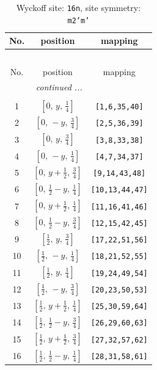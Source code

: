 \documentclass[fleqn,8pt]{jsarticle}
\begin{document}
\renewcommand{\arraystretch}{1.2}
\begin{longtable}{ccc}
\caption{Wyckoff site: {\tt 16n}, site symmetry: {\tt m2'm'}}
 \\
 \hline \hline
No. & position & mapping \\ \hline \endfirsthead

\multicolumn{2}{l}{\tablename\ \thetable{}} \\
 \hline \hline
No. & position & mapping \\ \hline \endhead

 \hline \hline
\multicolumn{2}{r}{\footnotesize\it continued ...} \\ \endfoot

 \hline \hline
\multicolumn{2}{r}{} \\ \endlastfoot

1 & $\left[ 0,\, y,\, \frac{1}{4} \right]$ & {\tt [1,6,35,40]} \\ \hline
2 & $\left[ 0,\, - y,\, \frac{3}{4} \right]$ & {\tt [2,5,36,39]} \\ \hline
3 & $\left[ 0,\, y,\, \frac{3}{4} \right]$ & {\tt [3,8,33,38]} \\ \hline
4 & $\left[ 0,\, - y,\, \frac{1}{4} \right]$ & {\tt [4,7,34,37]} \\ \hline
5 & $\left[ 0,\, y + \frac{1}{2},\, \frac{3}{4} \right]$ & {\tt [9,14,43,48]} \\ \hline
6 & $\left[ 0,\, \frac{1}{2} - y,\, \frac{1}{4} \right]$ & {\tt [10,13,44,47]} \\ \hline
7 & $\left[ 0,\, y + \frac{1}{2},\, \frac{1}{4} \right]$ & {\tt [11,16,41,46]} \\ \hline
8 & $\left[ 0,\, \frac{1}{2} - y,\, \frac{3}{4} \right]$ & {\tt [12,15,42,45]} \\ \hline
9 & $\left[ \frac{1}{2},\, y,\, \frac{3}{4} \right]$ & {\tt [17,22,51,56]} \\ \hline
10 & $\left[ \frac{1}{2},\, - y,\, \frac{1}{4} \right]$ & {\tt [18,21,52,55]} \\ \hline
11 & $\left[ \frac{1}{2},\, y,\, \frac{1}{4} \right]$ & {\tt [19,24,49,54]} \\ \hline
12 & $\left[ \frac{1}{2},\, - y,\, \frac{3}{4} \right]$ & {\tt [20,23,50,53]} \\ \hline
13 & $\left[ \frac{1}{2},\, y + \frac{1}{2},\, \frac{1}{4} \right]$ & {\tt [25,30,59,64]} \\ \hline
14 & $\left[ \frac{1}{2},\, \frac{1}{2} - y,\, \frac{3}{4} \right]$ & {\tt [26,29,60,63]} \\ \hline
15 & $\left[ \frac{1}{2},\, y + \frac{1}{2},\, \frac{3}{4} \right]$ & {\tt [27,32,57,62]} \\ \hline
16 & $\left[ \frac{1}{2},\, \frac{1}{2} - y,\, \frac{1}{4} \right]$ & {\tt [28,31,58,61]} \\
\end{longtable}
\end{document}
